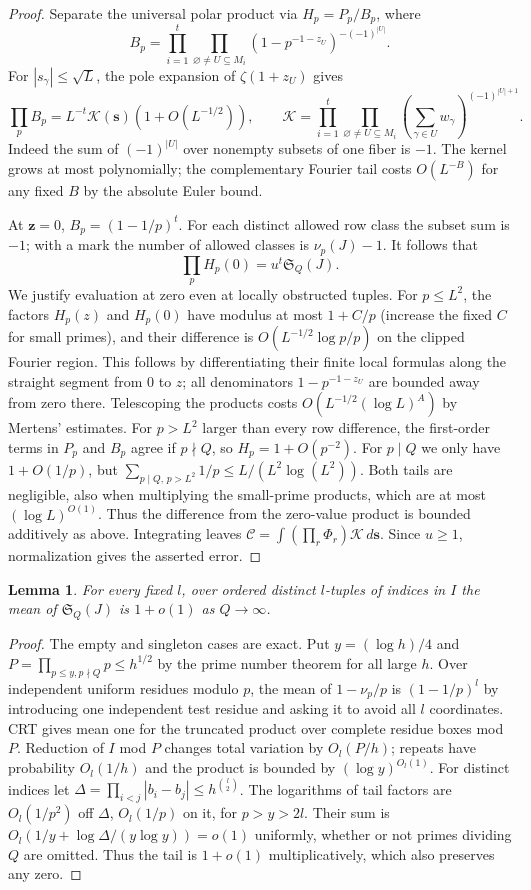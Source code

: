 \documentclass[11pt]{article}
\newtheorem{lemma}[theorem]{Lemma}
\newcommand{\Sg}{\mathfrak S}
\begin{document}
\begin{proof}
Separate the universal polar product via $H_p=P_p/B_p$, where
\[
 B_p=\prod_{i=1}^t\prod_{\varnothing\ne U\subseteq M_i}
 (1-p^{-1-z_U})^{-(-1)^{|U|}}.
\]
For $|s_\gamma|\le\sqrt L$, the pole expansion of $\zeta(1+z_U)$
gives
\[
 \prod_pB_p=L^{-t}\mathcal K(\mathbf s)(1+O(L^{-1/2})),\qquad
 \mathcal K=\prod_{i=1}^t\prod_{\varnothing\ne U\subseteq M_i}
 \left(\sum_{\gamma\in U}w_\gamma\right)^{(-1)^{|U|+1}}.
\]
Indeed the sum of $(-1)^{|U|}$ over nonempty subsets of one fiber is
$-1$. The kernel grows at most polynomially; the complementary Fourier
tail costs $O(L^{-B})$ for any fixed $B$ by the absolute Euler bound.

At $\mathbf z=0$, $B_p=(1-1/p)^t$. For each distinct allowed row
class the subset sum is $-1$; with a mark the number of allowed classes
is $\nu_p(J)-1$. It follows that
\[
 \prod_p H_p(0)=u^t\Sg_Q(J).
\]
We justify evaluation at zero even at locally obstructed tuples.
For $p\le L^2$, the factors $H_p(z)$ and $H_p(0)$ have modulus at most
$1+C/p$ (increase the fixed $C$ for small primes), and their
difference is $O(L^{-1/2}\log p/p)$ on the clipped Fourier region.
This follows by differentiating their finite local formulas along
the straight segment from $0$ to $z$; all denominators
$1-p^{-1-z_U}$ are bounded away from zero there. Telescoping the products
costs $O(L^{-1/2}(\log L)^A)$ by Mertens' estimates. For $p>L^2$
larger than every row difference, the first-order terms in $P_p$ and
$B_p$ agree if $p\nmid Q$, so $H_p=1+O(p^{-2})$. For $p\mid Q$ we only have
$1+O(1/p)$, but $\sum_{p\mid Q,\,p>L^2}1/p\le L/(L^2\log(L^2))$.
Both tails are negligible, also when multiplying the small-prime
products, which are at most $(\log L)^{O(1)}$. Thus the difference
from the zero-value product is bounded additively as above.
Integrating leaves
$\mathcal C=\int (\prod_r\Phi_r)\mathcal K\,d\mathbf s$.
Since $u\ge1$, normalization gives the asserted error.
\end{proof}

\begin{lemma}\label{av}
For every fixed $l$, over ordered distinct $l$-tuples of indices in $I$
the mean of $\Sg_Q(J)$ is $1+o(1)$ as $Q\to\infty$.
\end{lemma}
\begin{proof}
The empty and singleton cases are exact. Put $y=(\log h)/4$ and
$P=\prod_{p\le y,p\nmid Q}p\le h^{1/2}$ by the prime number theorem
for all large $h$. Over independent uniform residues modulo $p$,
the mean of $1-\nu_p/p$ is $(1-1/p)^l$ by introducing one independent
test residue and asking it to avoid all $l$ coordinates. CRT gives
mean one for the truncated product over complete residue boxes mod $P$.
Reduction of $I$ mod $P$ changes total variation by $O_l(P/h)$;
repeats have probability $O_l(1/h)$ and the product is bounded
by $(\log y)^{O_l(1)}$. For distinct indices let
$\Delta=\prod_{i<j}|b_i-b_j|\le h^{\binom l2}$.
The logarithms of tail factors are $O_l(1/p^2)$ off $\Delta$,
$O_l(1/p)$ on it, for $p>y>2l$.
Their sum is $O_l(1/y+\log\Delta/(y\log y))=o(1)$ uniformly,
whether or not primes dividing $Q$ are omitted. Thus the tail is
$1+o(1)$ multiplicatively, which also preserves any zero.
\end{proof}
\end{document}
